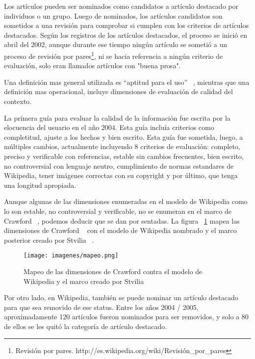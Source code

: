 Los art\'iculos pueden ser nominados como candidatos a art\'iculo destacado por individuos o un grupo. Luego de nominados, los art\'iculos  candidatos son sometidos a una revisi\'on para comprobar si cumplen con los criterios de art\'iculos destacados. Seg\'un los registros de los art\'iculos destacados, el proceso se inici\'o en abril del 2002, aunque durante ese tiempo ning\'un art\'iculo se someti\'o a un proceso de revisi\'on por pares\footnote{Revisi\'on por pares. http://es.wikipedia.org/wiki/Revisi\'on\_por\_pares}, ni se hacia referencia a ning\'un criterio de evaluaci\'on, solo eran llamados art\'iculos con "buena prosa".

Una definici\'on mas general utilizada es ``aptitud para el uso'' ~\cite{JurJ:92}, mientras que una definici\'on mas operacional, incluye dimensiones de evaluaci\'on de calidad del contexto.

La primera gu\'ia para evaluar la calidad de la informaci\'on fue escrita por la elocuencia del usuario en el a\~no 2004. Esta gu\'ia inclu\'ia criterios como completitud, ajuste a los hechos y bien escrito. Esta gu\'ia fue sometida, luego, a m\'ultiples cambios, actualmente incluyendo 8 criterios de evaluaci\'on: completo, preciso y verificable con referencias, estable sin cambios frecuentes, bien escrito, no controversial con lenguaje neutro, cumplimiento de normas estandares de Wikipedia, tener im\'agenes correctas con su copyright y por \'ultimo, que tenga una longitud apropiada.

Aunque algunas de las dimensiones enumeradas en el modelo de Wikipedia como lo son estable, no controversial y verificable, no se enumeran en el marco de Crawford ~\cite{CrawH:01}, podemos deducir que se dan por sentadas.
La figura ~\ref{fig:jobInformationDialog} mapea las dimensiones de Crawford ~\cite{CrawH:01} con el modelo de Wikipedia nombrado y el marco posterior creado por Stvilia ~\cite{GasStv:01}.

\begin{figure}[h!]
	\begin{center}
		\texttt{[image: imagenes/mapeo.png]}
		\caption{Mapeo de las dimensiones de Crawford contra el modelo de Wikipedia y el marco creado por Stvilia}
		\label{fig:jobInformationDialog}
	\end{center}
\end{figure}

Por otro lado, en Wikipedia, tambi\'en se puede nominar un art\'iculo destacado para que sea removido de ese status. Entre los a\~nos 2004 / 2005,  aproximadamente 120 art\'iculos fueron nominados para ser removidos, y solo a 80 de ellos se les quit\'o la categor\'ia de art\'iculo destacado.

